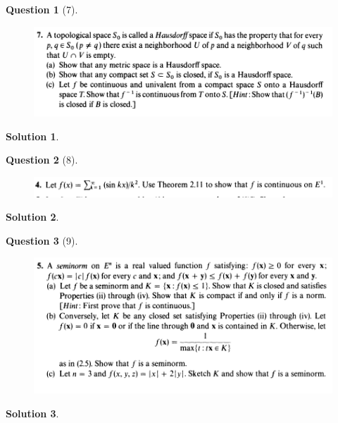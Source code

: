 \documentclass{article} %
\theoremstyle{quest}
\newtheorem*{question}{Question}
\newtheorem*{solution}{Solution}
\begin{document}
\begin{question}[7]
\hfill
\begin{figure}[h!]
  \centering
    \includegraphics[width=1\textwidth]{MA-2-29-7.png}
\end{figure}
\end{question}
\begin{solution} 
 
 
\end{solution}
\newpage

\begin{question}[8]
\hfill
\begin{figure}[h!]
  \centering
    \includegraphics[width=1\textwidth]{MA-2-210-4.png}
\end{figure}
\end{question}
\begin{solution} 
 
 
\end{solution}
\newpage

\begin{question}[9]
\hfill
\begin{figure}[h!]
  \centering
    \includegraphics[width=1\textwidth]{MA-2-211-5.png}
\end{figure}
\end{question}
\begin{solution} 
 
 
\end{solution}

\newpage
\end{document}
